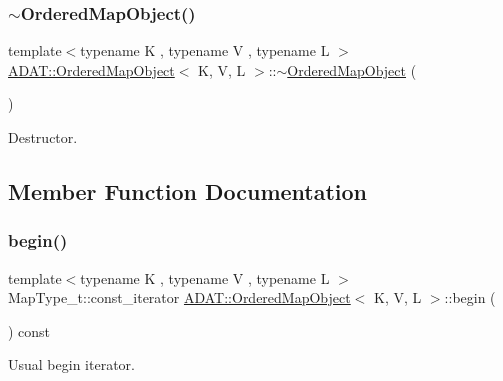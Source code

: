 \subsubsection{\texorpdfstring{$\sim$OrderedMapObject()}{~OrderedMapObject()}}
{\footnotesize\ttfamily template$<$typename K , typename V , typename L $>$ \\
\mbox{\hyperlink{classADAT_1_1OrderedMapObject}{A\+D\+A\+T\+::\+Ordered\+Map\+Object}}$<$ K, V, L $>$\+::$\sim$\mbox{\hyperlink{classADAT_1_1OrderedMapObject}{Ordered\+Map\+Object}} (\begin{DoxyParamCaption}{ }\end{DoxyParamCaption})\hspace{0.3cm}{\ttfamily [inline]}}



Destructor. 



\subsection{Member Function Documentation}
\mbox{\label{classADAT_1_1OrderedMapObject_afe44774d4a446c8f66ea5d6bd2c5d59f}} 
\subsubsection{\texorpdfstring{begin()}{begin()}}
{\footnotesize\ttfamily template$<$typename K , typename V , typename L $>$ \\
Map\+Type\+\_\+t\+::const\+\_\+iterator \mbox{\hyperlink{classADAT_1_1OrderedMapObject}{A\+D\+A\+T\+::\+Ordered\+Map\+Object}}$<$ K, V, L $>$\+::begin (\begin{DoxyParamCaption}{ }\end{DoxyParamCaption}) const\hspace{0.3cm}{\ttfamily [inline]}}



Usual begin iterator. 

\mbox{\label{classADAT_1_1OrderedMapObject_a5bf5e1a45535f8277499ac9a149a2b26}} 
